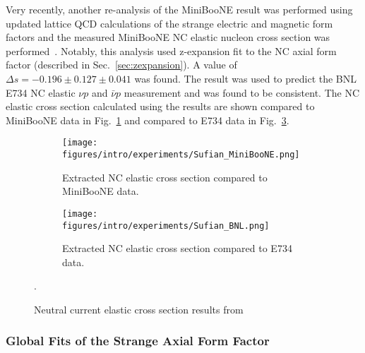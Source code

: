     Very recently, another re-analysis of the MiniBooNE result was performed
    using updated lattice QCD calculations of the strange electric and magnetic
    form factors and the measured MiniBooNE NC elastic nucleon cross section
    was performed~\cite{Sufian:2018qtw}. Notably, this analysis used
    z-expansion fit to the NC axial form factor (described in
    Sec.~\ref{sec:zexpansion}). A value of $\Delta s = -0.196\pm 0.127\pm
    0.041$ was found. The result was used to predict the BNL E734 NC elastic
    $\nu p$ and $\bar{\nu} p$ measurement and was found to be consistent. The
    NC elastic cross section calculated using the results are shown compared to
    MiniBooNE data in Fig.~\ref{fig:sufianuboone} and compared to E734 data in
    Fig.~\ref{fig:sufiane734}.
    \begin{figure}[h]
      \centering
      \begin{subfigure}[t]{2.5in}
        \texttt{[image: figures/intro/experiments/Sufian\_MiniBooNE.png]}
        \caption{Extracted NC elastic cross section compared to MiniBooNE data.}
        \label{fig:sufianuboone}
      \end{subfigure}
      \hspace{2pt}
      \begin{subfigure}[t]{2.5in}
        \texttt{[image: figures/intro/experiments/Sufian\_BNL.png]}
        \caption{Extracted NC elastic cross section compared to E734 data.}
        \label{fig:sufiane734}
      \end{subfigure}
      \caption{Neutral current elastic cross section results
      from~\cite{Sufian:2018qtw}}.
      \label{fig:sufiane734}
    \end{figure}

    \subsubsection{Global Fits of the Strange Axial Form Factor}


